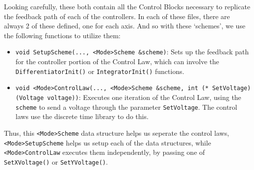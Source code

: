 \documentclass[letterpaper]{article}
\begin{document}
Looking carefully, these both contain all the Control Blocks necessary to replicate the feedback path of each of the controllers. In each of these files, there are always 2 of these defined, one for each axis. And so with these `schemes', we use the following functions to utilize them:
\begin{itemize}
    \item \texttt{void SetupScheme(..., <Mode>Scheme \&scheme)}: Sets up the feedback path for the controller portion of the Control Law, which can involve the \texttt{DifferentiatorInit()} or \texttt{IntegratorInit()} functions.
    \item \texttt{void <Mode>ControlLaw(..., <Mode>Scheme \&scheme, int (* SetVoltage)(Voltage voltage))}: Executes one iteration of the Control Law, using the \texttt{scheme} to send a voltage through the parameter \texttt{SetVoltage}. The control laws use the discrete time library to do this.
\end{itemize}
Thus, this \texttt{<Mode>Scheme} data structure helps us seperate the control laws, \texttt{<Mode>SetupScheme} helps us setup each of the data structures, while \texttt{<Mode>ControlLaw} executes them independently, by passing one of \texttt{SetXVoltage()} or \texttt{SetYVoltage()}.
\end{document}
